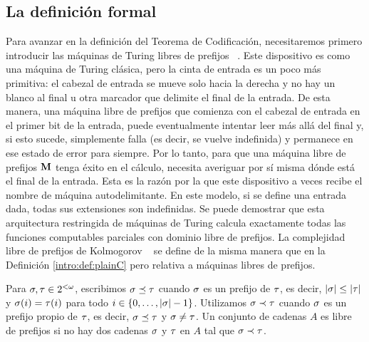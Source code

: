 \subsection{La definición formal}



Para avanzar en la definición del Teorema de Codificación, necesitaremos primero introducir las máquinas de Turing libres de prefijos ~\cite{L71,L73,S71,chaitin1975theory}. Este dispositivo es como una máquina de Turing clásica, pero la cinta de entrada es un poco más primitiva: el cabezal de entrada se mueve solo hacia la derecha y no hay un blanco al final u otra marcador que delimite el final de la entrada. De esta manera, una máquina libre de prefijos que comienza con el cabezal de entrada en el primer bit de la entrada, puede eventualmente intentar leer más allá del final y, si esto sucede, simplemente falla (es decir, se vuelve indefinida) y permanece en ese estado de error para siempre. Por lo tanto, para que una máquina libre de prefijos ${\bf M}$ tenga éxito en el cálculo, necesita averiguar por sí misma dónde está el final de la entrada. Esta es la razón por la que este dispositivo a veces recibe el nombre de máquina autodelimitante. En este modelo, si se define una entrada dada, todas sus extensiones son indefinidas. Se puede demostrar que esta arquitectura restringida de máquinas de Turing calcula exactamente todas las funciones computables parciales con dominio libre de prefijos. La complejidad libre de prefijos de Kolmogorov ~\cite{levin1974laws,G74,chaitin1975theory} se define de la misma manera que en la Definición \ref{intro:def:plainC} pero relativa a máquinas libres de prefijos.


\begin{definicion}\label{seleccion:def:conjuntolibreprefijos}

Para
$\sigma,\tau\in2^{<\omega}$, escribimos
\glossary{$\preceq$}$\sigma\preceq\tau$ cuando $\sigma$ es un prefijo de
$\tau$, es decir, $| \sigma |\leq| \tau |$ y $\sigma(i)=\tau(i)$
para todo $i\in\{0,\dots,| \sigma |-1 \}$. Utilizamos
\glossary{$\prec$}$\sigma\prec\tau$ cuando $\sigma$ es un prefijo propio de $\tau$, es decir, $\sigma\preceq \tau$ y $\sigma\not=\tau$. Un conjunto de cadenas $A$ es libre de prefijos si no hay dos cadenas $\sigma$
y $\tau$ en $A$ tal que $\sigma\prec\tau$. 


\end{definicion}

